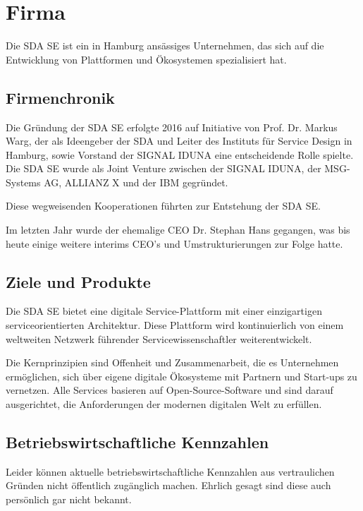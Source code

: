 \chapter{Firma}
\label{ch:firma}
Die SDA SE ist ein in Hamburg ansässiges Unternehmen, das sich auf die Entwicklung von Plattformen und Ökosystemen spezialisiert hat.

\section{Firmenchronik}
\label{sec:intro:firmenchronik}
Die Gründung der SDA SE erfolgte 2016 auf Initiative von Prof. Dr. Markus Warg, der als Ideengeber der SDA und Leiter des Instituts
für Service Design in Hamburg, sowie Vorstand der SIGNAL IDUNA eine entscheidende Rolle spielte.
Die SDA SE wurde als Joint Venture zwischen der SIGNAL IDUNA, der MSG-Systems AG, ALLIANZ X und der IBM gegründet.
\medskip

\noindent
Diese wegweisenden Kooperationen führten zur Entstehung der SDA SE.
\medskip

\noindent
Im letzten Jahr wurde der ehemalige CEO Dr. Stephan Hans gegangen, was bis heute einige weitere interims CEO's und Umstrukturierungen zur Folge hatte.

\section{Ziele und Produkte}
\label{sec:intro:produktspekturm}
Die SDA SE bietet eine digitale Service-Plattform mit einer einzigartigen serviceorientierten Architektur.
Diese Plattform wird kontinuierlich von einem weltweiten Netzwerk führender Servicewissenschaftler weiterentwickelt.
\medskip

\noindent
Die Kernprinzipien sind Offenheit und Zusammenarbeit, die es Unternehmen ermöglichen, sich über eigene digitale Ökosysteme mit Partnern und Start-ups zu vernetzen.
Alle Services basieren auf Open-Source-Software und sind darauf ausgerichtet, die Anforderungen der modernen digitalen Welt zu erfüllen.

\section{Betriebswirtschaftliche Kennzahlen}
\label{sec:intro:betrwirtschaftliche-kennzahlen}
Leider können aktuelle betriebswirtschaftliche Kennzahlen
aus vertraulichen Gründen nicht öffentlich zugänglich machen.
Ehrlich gesagt sind diese auch persönlich gar nicht bekannt.

